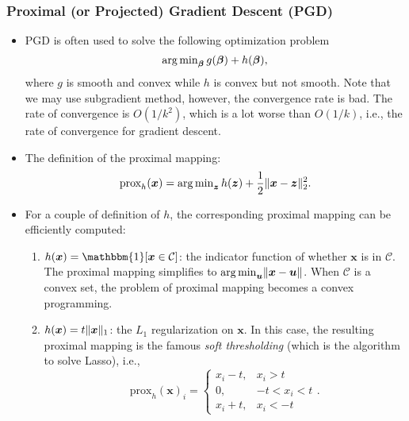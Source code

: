     \subsubsection{Proximal (or Projected) Gradient Descent (PGD)}
    \begin{itemize}
        \item PGD is often used to solve the following optimization problem
            \begin{equation}
                \operatorname{arg\,min}_{\bm{\beta}} g(\bm{\beta}) + h(\bm{\beta}),
            \end{equation}
        where $g$ is smooth and convex while $h$ is convex but not smooth.  
        Note that we may use subgradient method, however, the convergence rate is bad.
        The rate of convergence is $O(1/k^2)$, which is a lot worse than $O(1/k)$, i.e., the rate of convergence for gradient descent.
        \item The definition of the proximal mapping:
            \begin{equation}
                \text{prox}_h(\bm{x}) = \operatorname{arg\,min}_{\bm{z}} h(\bm{z}) + \frac{1}{2}\lVert\bm{x} - \bm{z}\rVert^2_2.
            \end{equation}
        \item For a couple of definition of $h$, the corresponding proximal mapping can be efficiently computed:
            \begin{enumerate}
                \item $h(\bm{x}) = \mathbbm{1}[\bm{x} \in \mathcal{C}]$: the indicator function of whether $\bm{x}$ is in $\mathcal{C}$. The proximal mapping simplifies to $\operatorname{arg\,min}_{\bm{u}}\lVert\bm{x} - \bm{u}\rVert$. When $\mathcal{C}$ is a convex set, the problem of proximal mapping becomes a convex programming.
                \item $h(\bm{x}) = t \lVert\bm{x}\rVert_1$: the $L_1$ regularization on $\bm{x}$. In this case, the resulting proximal mapping is the famous \emph{soft thresholding} (which is the algorithm to solve Lasso), i.e., 
                    \begin{equation}
                        \text{prox}_h(\bm{x})_i = \begin{cases}
                            x_i - t,&  x_i > t \\
                            0, & -t < x_i < t \\
                            x_i + t, & x_i < -t
                        \end{cases}.
                    \end{equation}
            \end{enumerate}
            

\end{itemize}
